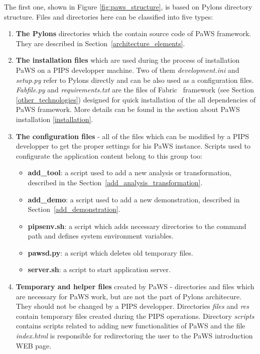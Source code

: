 The first one, shown in Figure \ref{fig:paws_structure}, is based on
Pylons directory structure. Files and directories here can
be classified into five types:

\begin{enumerate}

\item {\bf The Pylons} directories which the contain source code
  of PaWS framework. They are described in Section~\ref{architecture_elements}.

\item {\bf The installation files} which are used during the process
  of installation PaWS on a PIPS developper machine. Two of them
  \emph{development.ini} and \emph{setup.py} refer to Pylons directly
  and can be also used as a configuration files. \emph{Fabfile.py} and
  \emph{requirements.txt} are the files of Fabric~\cite{} framework (see
  Section \ref{other_technologies}) designed for quick installation of
  the all dependencies of PaWS framework. More details can be found in
  the section about PaWS installation \ref{installation}.

  \item {\bf The configuration files} - all of the files which can be
    modified by a PIPS developper to get the proper settings for his PaWS
    instance. Scripts used to configurate the application
    content belong to this group too:
    \begin{itemize}
    \item {\bf add\_tool}: a script used to add a new analysis or
      transformation, described in the
      Section~\ref{add_analysis_transformation}.
    \item {\bf add\_demo}: a script used to add a new demonstration,
      described in  Section~\ref{add_demonstration}.
    \item {\bf pipsenv.sh}: a script which adds
      necessary directories to the command path and defines system
      environment variables.
    \item {\bf pawsd.py}: a script which deletes
      old temporary files.
    \item {\bf server.sh}: a script to start application server.
    \end{itemize}

  \item {\bf Temporary and helper files} created by PaWS - directories
    and files which are necessary for PaWS work, but are not the part
    of Pylons architecure. They should not be changed by a PIPS
    developper. Directories \emph{files} and \emph{res} contain
    temporary files created during the PIPS operations. Directory
    \emph{scripts} contains scripts related to adding new
    functionalities of PaWS and the file \emph{index.html} is
    responsible for redirectoring the user to the PaWS introduction
    WEB page.


\end{enumerate}
